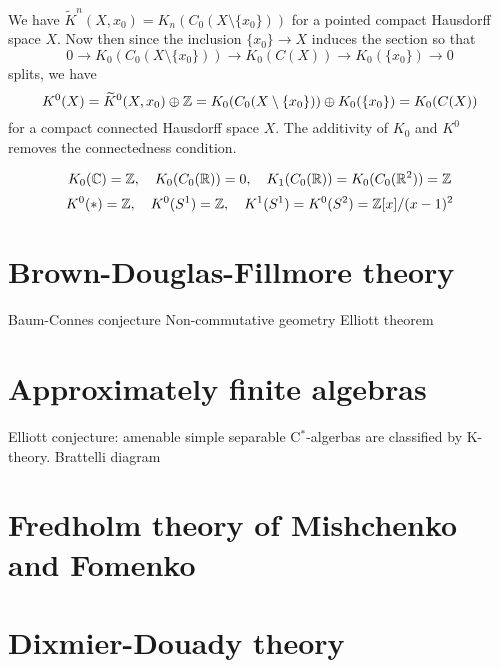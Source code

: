 \documentclass{../../large}
\begin{document}
We have $\tilde K^n(X,x_0)=K_n(C_0(X\setminus\{x_0\}))$ for a pointed compact Hausdorff space $X$.
Now then since the inclusion $\{x_0\}\to X$ induces the section so that
\[0\to K_0(C_0(X\setminus\{x_0\}))\to K_0(C(X))\to K_0(\{x_0\})\to0\]
splits, we have
\[K^0(X)=\widetilde K^0(X,x_0)\oplus\mathbb{Z}=K_0(C_0(X\setminus\{x_0\}))\oplus K_0(\{x_0\})=K_0(C(X))\]
for a compact connected Hausdorff space $X$.
The additivity of $K_0$ and $K^0$ removes the connectedness condition.

\[K_0(\mathbb{C})=\mathbb{Z},\quad K_0(C_0(\mathbb{R}))=0,\quad K_1(C_0(\mathbb{R}))=K_0(C_0(\mathbb{R}^2))=\mathbb{Z}\]
\[K^0(*)=\mathbb{Z},\quad K^0(S^1)=\mathbb{Z},\quad K^1(S^1)=K^0(S^2)=\mathbb{Z}[x]/(x-1)^2\]





\section{Brown-Douglas-Fillmore theory}
\begin{prb}
\end{prb}

Baum-Connes conjecture
Non-commutative geometry
Elliott theorem




\section{Approximately finite algebras}
Elliott conjecture: amenable simple separable C$^*$-algerbas are classified by K-theory.
Brattelli diagram



\section{Fredholm theory of Mishchenko and Fomenko}




\section{Dixmier-Douady theory}
\end{document}
